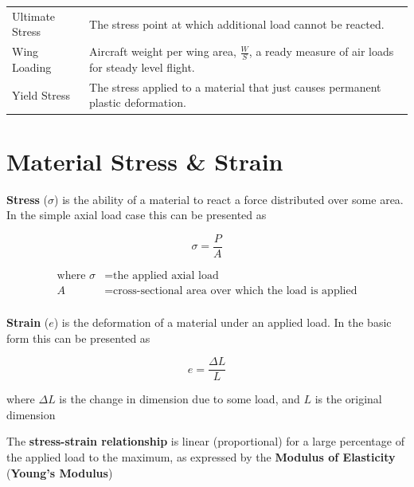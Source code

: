 \documentclass[
]{book}
\begin{document}
\begin{longtable}[]{@{}ll@{}}
\begin{minipage}[t]{0.14\columnwidth}
Ultimate Stress\strut
\end{minipage} & \begin{minipage}[t]{0.80\columnwidth}\raggedright
The stress point at which additional load cannot be reacted.\strut
\end{minipage}\tabularnewline
\begin{minipage}[t]{0.14\columnwidth}\raggedright
Wing Loading\strut
\end{minipage} & \begin{minipage}[t]{0.80\columnwidth}\raggedright
Aircraft weight per wing area, \(\frac{W}{S}\), a ready measure of air loads for steady level flight.\strut
\end{minipage}\tabularnewline
\begin{minipage}[t]{0.14\columnwidth}\raggedright
Yield Stress\strut
\end{minipage} & \begin{minipage}[t]{0.80\columnwidth}\raggedright
The stress applied to a material that just causes permanent plastic deformation.\strut
\end{minipage}\tabularnewline
\bottomrule
\end{longtable}

\hypertarget{material-stress-strain}{%
\section{Material Stress \& Strain}\label{material-stress-strain}}

\textbf{Stress} (\(\sigma\)) is the ability of a material to react a force distributed over some area. In the simple axial load case this can be presented as

\[
  \sigma = \frac{P}{A}
\]

\[
  \begin{align}
  \text{where } \sigma &= \text{the applied axial load} \\
  A &= \text{cross-sectional area over which the load is applied} \\
  \end{align}
\]

\textbf{Strain} (\(e\)) is the deformation of a material under an applied load. In the basic form this can be presented as

\[
  e = \frac{\Delta L}{L}
\]

where \(\Delta L\) is the change in dimension due to some load, and \(L\) is the original dimension

The \textbf{stress-strain relationship} is linear (proportional) for a large percentage of the applied load to the maximum, as expressed by the \textbf{Modulus of Elasticity} (\textbf{Young's Modulus})
\end{document}
